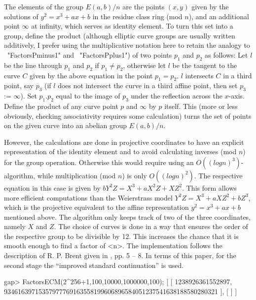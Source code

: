 The elements of the group $E(a,b)/n$ are the points $(x,y)$ given by the
solutions of $y^2 = x^3 + ax + b$ in the residue class ring (mod $n$),
and an additional point $\infty$ at infinity, which serves as
identity element.
To turn this set into a group, define the product
(although elliptic curve groups are usually written additively,
I prefer using the multiplicative notation here to retain the analogy
to ~"FactorsPminus1" and ~"FactorsPplus1") of two points
$p_1$ and $p_2$ as follows:
Let $l$ be the line through $p_1$ and $p_2$ if $p_1 \neq p_2$,
otherwise let $l$ be the tangent to the curve $C$ given by the
above equation in the point $p_1 = p_2$.
$l$ intersects $C$ in a third point, say $p_3$ 
(if $l$ does not intersect the curve in a
third affine point, then set $p_3$ := $\infty$).
Set $p_1.p_2$ equal to the image of $p_3$ under
the reflection across the $x$-axis.
Define the product of any curve point $p$ and $\infty$ by $p$ itself.
This (more or less obviously, checking associativity requires some
calculation) turns the set of points on the given curve
into an abelian group $E(a,b)/n$.

However, the calculations are done in
projective coordinates to have an explicit representation of the
identity element and to avoid calculating inverses (mod $n$)
for the group operation. Otherwise this would require using an
$O((log n)^3)$-algorithm, while multiplication (mod $n$) is only
$O((log n)^2)$. The respective equation in this case is given by
$bY^2Z = X^3 + aX^2Z + XZ^2$. This form allows more efficient
computations than the
Weierstrass model 
$Y^2Z = X^3 + aXZ^2 + bZ^3$, which is the projective equivalent to
the affine representation $y^2 = x^3 + ax + b$ mentioned above.
The algorithm only keeps track of two of the three coordinates,
namely $X$ and $Z$.
The choice of curves is done in a way that ensures the order of
the respective group to be divisible by 12. This increases the
chance that it is smooth enough to find a factor of <n>.
The implementation follows the description of R. P. Brent given in
\cite{Brent96}, pp. 5 -- 8. In terms of this paper,
for the second stage the ``improved standard continuation'' is used.

\beginexample
gap> FactorsECM(2^256+1,100,10000,1000000,100);
[ [ 1238926361552897, 
      93461639715357977769163558199606896584051237541638188580280321 ], [  ] ]
\endexample


